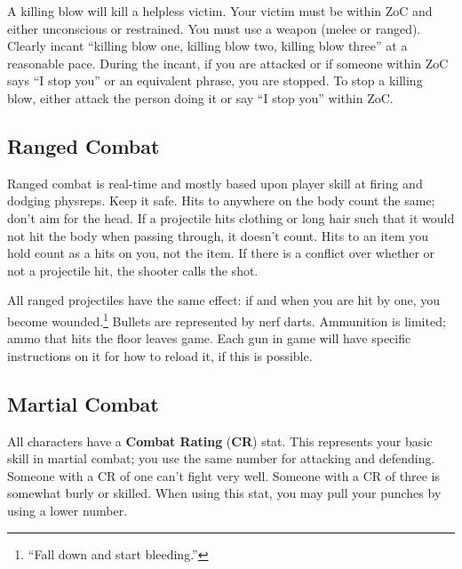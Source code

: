 \documentclass[sheet]{airship}
\begin{document}
A killing blow will kill a helpless victim.  Your victim must be
within ZoC and either unconscious or restrained.  You must use a
weapon (melee or ranged).  Clearly incant ``killing blow one, killing
blow two, killing blow three'' at a reasonable pace.  During the
incant, if you are attacked or if someone within ZoC says ``I stop
you'' or an equivalent phrase, you are stopped.  To stop a killing
blow, either attack the person doing it or say ``I stop you'' within
ZoC.

\subsection{Ranged Combat}

Ranged combat is real-time and mostly based upon player skill at
firing and dodging physreps.  Keep it safe.  Hits to anywhere on the
body count the same; don't aim for the head.  If a projectile hits
clothing or long hair such that it would not hit the body when passing
through, it doesn't count.  Hits to an item you hold count as a hits
on you, not the item.  If there is a conflict over whether or not a
projectile hit, the shooter calls the shot.

All ranged projectiles have the same effect: if and when you are hit
by one, you become wounded.\footnote{``Fall down and start bleeding.''}  Bullets are represented by nerf darts.  Ammunition is limited; ammo that hits the floor leaves game. Each gun in game will have specific instructions on it for how to reload it, if this is possible.


%

\subsection{Martial Combat}

All characters have a {\bf Combat Rating} ({\bf CR}) stat.  This
represents your basic skill in martial combat; you use the same number
for attacking and defending.  Someone with a CR of one can't fight
very well.  Someone with a CR of three is somewhat burly or skilled.
When using this stat, you may pull your punches by using a lower
number.
  
\end{document}
